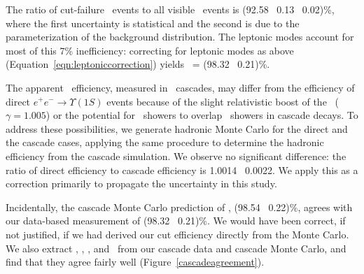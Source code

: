 \documentclass{cornell}
\begin{document}
The ratio of cut-failure \us\ events to all visible \us\ events is
(92.58 \PM\ 0.13 \PM\ 0.02)\%, where the first uncertainty is
statistical and the second is due to the parameterization of the
background distribution.  The leptonic modes account for most of this
7\% inefficiency: correcting for leptonic modes as above
(Equation~\ref{eqn:leptoniccorrection}) yields \ecuts\ = (98.32 \PM\
0.21)\%.

The apparent \us\ efficiency, measured in \twotoone\ cascades, may
differ from the efficiency of direct $e^+e^- \to \Upsilon(1S)$ events
because of the slight relativistic boost of the \us\ ($\gamma =
1.005$) or the potential for \pipi\ showers to overlap \us\ showers in
cascade decays.  To address these possibilities, we generate hadronic
Monte Carlo for the direct and the cascade cases, applying the same
procedure to determine the hadronic efficiency from the cascade
simulation.  We observe no significant difference: the ratio of direct
efficiency to cascade efficiency is 1.0014 \PM\ 0.0022.  We apply this
as a correction primarily to propagate the uncertainty in this study.

Incidentally, the cascade Monte Carlo prediction of \ecuts, (98.54
\PM\ 0.22)\%, agrees with our data-based measurement of (98.32 \PM\
0.21)\%.  We would have been correct, if not justified, if we had
derived our cut efficiency directly from the Monte Carlo.  We also
extract \pmax, \visen, \dxy, and \dz\ from our cascade data and
cascade Monte Carlo, and find that they agree fairly well (Figure~\ref{cascadeagreement}).
\end{document}
